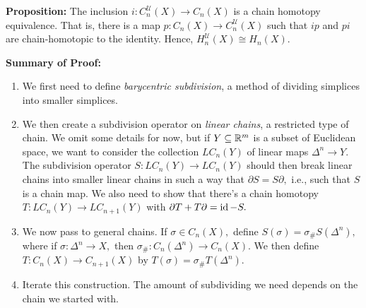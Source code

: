 \documentclass{article}
\begin{document}
\textbf{Proposition:} The inclusion $i: C_n^\mathcal{U}(X) \to C_n(X)$ is a chain homotopy equivalence. That is, there is a map $p: C_n(X) \to C_n^\mathcal{U}(X)$ such that $ip$ and $pi$ are chain-homotopic to the identity. Hence, $H_n^\mathcal{U}(X) \cong H_n(X).$%

\textbf{Summary of Proof:}%

\begin{enumerate}%

\item{}
We first need to define \emph{barycentric subdivision}, a method of dividing simplices into smaller simplices.%

\item{}
We then create a subdivision operator on \emph{linear chains}, a restricted type of chain. We omit some details for now, but if $Y \subseteq \mathbb{R}^m$ is a subset of Euclidean space, we want to consider the collection $LC_n(Y)$ of linear maps $\Delta^n \to Y.$ The subdivision operator $S: LC_n(Y) \to LC_n(Y)$ should then break linear chains into smaller linear chains in such a way that $\partial S = S \partial,$ i.e., such that $S$ is a chain map. We also need to show that there's a chain homotopy $T: LC_n(Y) \to LC_{n+1}(Y)$ with $\partial T + T \partial = \operatorname{id} - S.$%

\item{}
We now pass to general chains. If $\sigma \in C_n(X),$ define $S(\sigma) = \sigma_\# S(\Delta^n),$ where if $\sigma: \Delta^n \to X,$ then $\sigma_\#: C_n(\Delta^n) \to C_n(X).$ We then define $T: C_n(X) \to C_{n+1}(X)$ by $T(\sigma) = \sigma_\# T(\Delta^n).$%

\item{}
Iterate this construction. The amount of subdividing we need depends on the chain we started with.%
\end{enumerate}%
\end{document}
